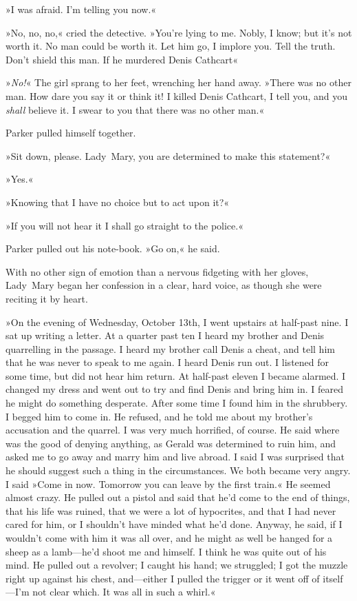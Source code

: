 »I was afraid. I'm telling you now.«

»No, no, no,« cried the detective. »You're lying to me. Nobly, I know; but it's not worth it. No man could be worth it. Let him go, I implore you. Tell the truth. Don't shield this man. If he murdered Denis Cathcart\longdash«

»\textit{No!}« The girl sprang to her feet, wrenching her hand away. »There was no other man. How dare you say it or think it! I killed Denis Cathcart, I tell you, and you \textit{shall} believe it. I swear to you that there was no other man.«

Parker pulled himself together.

»Sit down, please. Lady~Mary, you are determined to make this statement?«

»Yes.«

»Knowing that I have no choice but to act upon it?«

»If you will not hear it I shall go straight to the police.«

Parker pulled out his note-book. »Go on,« he said.

With no other sign of emotion than a nervous fidgeting with her gloves, Lady~Mary began her confession in a clear, hard voice, as though she were reciting it by heart.

»On the evening of Wednesday, October 13th, I went upstairs at half-past nine. I sat up writing a letter. At a quarter past ten I heard my brother and Denis quarrelling in the passage. I heard my brother call Denis a cheat, and tell him that he was never to speak to me again. I heard Denis run out. I listened for some time, but did not hear him return. At half-past eleven I became alarmed. I changed my dress and went out to try and find Denis and bring him in. I feared he might do something desperate. After some time I found him in the shrubbery. I begged him to come in. He refused, and he told me about my brother's accusation and the quarrel. I was very much horrified, of course. He said where was the good of denying anything, as Gerald was determined to ruin him, and asked me to go away and marry him and live abroad. I said I was surprised that he should suggest such a thing in the circumstances. We both became very angry. I said »Come in now.  Tomorrow you can leave by the first train.« He seemed almost crazy. He pulled out a pistol and said that he'd come to the end of things, that his life was ruined, that we were a lot of hypocrites, and that I had never cared for him, or I shouldn't have minded what he'd done. Anyway, he said, if I wouldn't come with him it was all over, and he might as well be hanged for a sheep as a lamb—he'd shoot me and himself. I think he was quite out of his mind. He pulled out a revolver; I caught his hand; we struggled; I got the muzzle right up against his chest, and—either I pulled the trigger or it went off of itself—I'm not clear which. It was all in such a whirl.«


